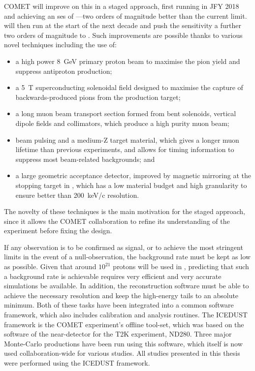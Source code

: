 COMET will improve on this in a staged approach, first running in \ac{JFY} 2018 and achieving an \ac{ses} of \sensePI---two orders of magnitude better than the current limit.
\phaseII will then run at the start of the next decade and push the sensitivity a further two orders of magnitude to \sensePII.
Such improvements are possible thanks to various novel techniques including the use of: 
\begin{itemize}
\item a high power 8~GeV primary proton beam to maximise the pion yield and suppress antiproton production;
\item a 5~T superconducting solenoidal field designed to maximise the capture of backwards-produced pions from the production target;
\item a long muon beam transport section formed from bent solenoids, vertical dipole fields and collimators, which produce a high purity muon beam;
\item beam pulsing and a medium-Z target material, which gives a longer muon lifetime than previous experiments, and allows for timing information to suppress most beam-related backgrounds; and
\item a large geometric acceptance detector, improved by magnetic mirroring at the stopping target in \phaseII, which has a low material budget and high granularity to ensure better than 200~keV/c resolution.
\end{itemize}
The novelty of these techniques is the main motivation for the staged approach, since it allows the COMET collaboration to refine its understanding of the experiment before fixing the \phaseII design.

If any observation is to be confirmed as signal, or to achieve the most stringent limits in the event of a null-observation, the background rate must be kept as low as possible.
Given that around $10^{21}$ protons will be used in \phaseII, predicting that such a background rate is achievable requires very efficient and very accurate simulations be available.
In addition, the reconstruction software must be able to achieve the necessary resolution and keep the high-energy tails to an absolute minimum.
Both of these tasks have been integrated into a common software framework, which also includes calibration and analysis routines.
The ICEDUST framework is the COMET experiment's offline tool-set, which was based on the software of the near-detector for the T2K experiment, ND280.
Three major Monte-Carlo productions have been run using this software, which itself is now used collaboration-wide for various studies.
All studies presented in this thesis were performed using the ICEDUST framework.

